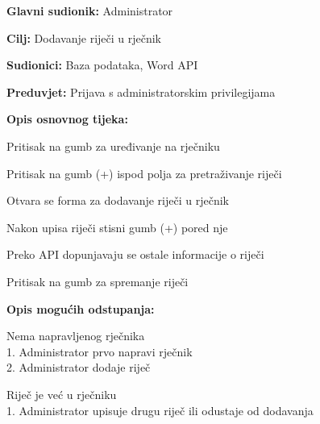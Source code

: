 					\noindent {}
					\begin{packed_item}
						\item \textbf{Glavni sudionik:} Administrator
						\item \textbf{Cilj:} Dodavanje riječi u rječnik
						\item \textbf{Sudionici:} Baza podataka, Word API
						\item \textbf{Preduvjet:} Prijava s administratorskim privilegijama
						\item \textbf{Opis osnovnog tijeka:}
						\begin{packed_enum}
							\item Pritisak na gumb za uređivanje na rječniku
							\item Pritisak na gumb (+) ispod polja za pretraživanje riječi
							\item Otvara se forma za dodavanje riječi u rječnik
							\item Nakon upisa riječi stisni gumb (+) pored nje
							\item Preko API dopunjavaju se ostale informacije o riječi
							\item Pritisak na gumb za spremanje riječi
						\end{packed_enum}
						\item \textbf{Opis mogućih odstupanja:}
						\begin{packed_item}
							\item [1.a] Nema napravljenog rječnika
							\\1. Administrator prvo napravi rječnik
							\\2. Administrator dodaje riječ
							\item [6.a] Riječ je već u rječniku
							\\1. Administrator upisuje drugu riječ ili odustaje od dodavanja
						\end{packed_item}
					\end{packed_item}

